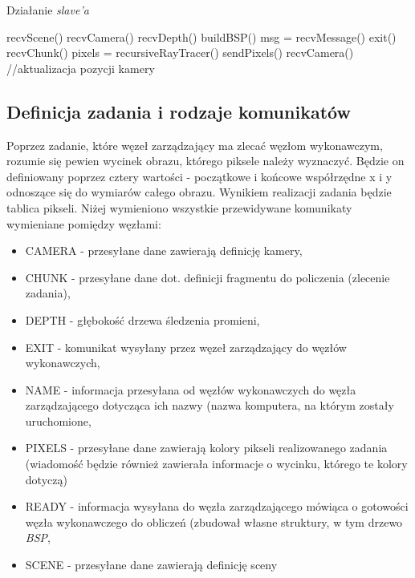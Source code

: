 \begin{algorithm}[H]
\caption{Działanie \emph{slave'a}}
\begin{algorithmic}
\State recvScene()
\State recvCamera()
\State recvDepth()
\State buildBSP()
\State msg = recvMessage()
 exit()
	\State recvChunk()
	\State pixels = recursiveRayTracer()
	\State sendPixels()
	recvCamera() //aktualizacja pozycji kamery
\EndIf
\EndWhile
\end{algorithmic}
\end{algorithm}


\subsection{Definicja zadania i rodzaje komunikatów}

Poprzez zadanie, które węzeł zarządzający ma zlecać węzłom wykonawczym, rozumie się pewien wycinek obrazu, którego piksele należy wyznaczyć. Będzie on definiowany poprzez cztery wartości - początkowe i końcowe współrzędne x i y odnoszące się do wymiarów całego obrazu. Wynikiem realizacji zadania będzie tablica pikseli. Niżej wymieniono wszystkie przewidywane komunikaty wymieniane pomiędzy węzłami:

\begin{itemize}

	\item CAMERA - przesyłane dane zawierają definicję kamery,
	\item CHUNK - przesyłane dane dot. definicji fragmentu do policzenia (zlecenie zadania),
	\item DEPTH - głębokość drzewa śledzenia promieni,
	\item EXIT - komunikat wysyłany przez węzeł zarządzający do węzłów wykonawczych,
	\item NAME - informacja przesyłana od węzłów wykonawczych do węzła zarządzającego dotycząca ich nazwy (nazwa komputera, na którym zostały uruchomione,
	\item PIXELS - przesyłane dane zawierają kolory pikseli realizowanego zadania (wiadomość będzie również zawierała informacje o wycinku, którego te kolory dotyczą)
	\item READY - informacja wysyłana do węzła zarządzającego mówiąca o gotowości węzła wykonawczego do obliczeń (zbudował własne struktury, w tym drzewo \emph{BSP},
	\item SCENE - przesyłane dane zawierają definicję sceny

\end{itemize}



